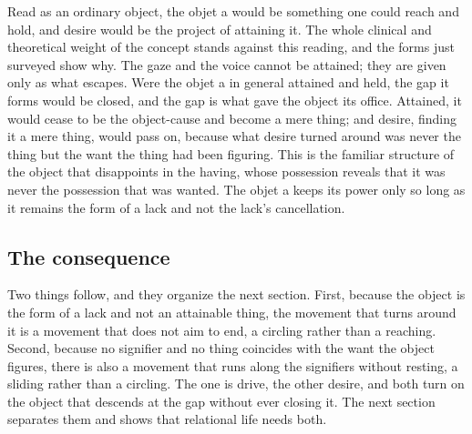Read as an ordinary object, the objet a would be something one could reach and hold, and desire would be the project of attaining it. The whole clinical and theoretical weight of the concept stands against this reading, and the forms just surveyed show why. The gaze and the voice cannot be attained; they are given only as what escapes. Were the objet a in general attained and held, the gap it forms would be closed, and the gap is what gave the object its office. Attained, it would cease to be the object-cause and become a mere thing; and desire, finding it a mere thing, would pass on, because what desire turned around was never the thing but the want the thing had been figuring. This is the familiar structure of the object that disappoints in the having, whose possession reveals that it was never the possession that was wanted. The objet a keeps its power only so long as it remains the form of a lack and not the lack's cancellation.

\subsection*{The consequence}

Two things follow, and they organize the next section. First, because the object is the form of a lack and not an attainable thing, the movement that turns around it is a movement that does not aim to end, a circling rather than a reaching. Second, because no signifier and no thing coincides with the want the object figures, there is also a movement that runs along the signifiers without resting, a sliding rather than a circling. The one is drive, the other desire, and both turn on the object that descends at the gap without ever closing it. The next section separates them and shows that relational life needs both.

